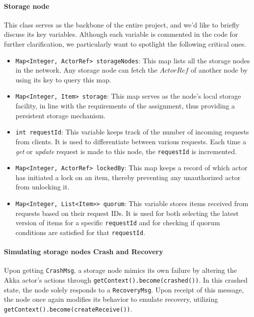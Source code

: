 \documentclass[a4paper, 11pt]{article}
\begin{document}
\paragraph{Storage node}\label{core_storage_class}

This class serves as the backbone of the entire project, and we'd like to briefly discuss its key variables. Although each variable is commented in the code for further clarification, we particularly want to spotlight the following critical ones.

\begin{itemize}
    \item \verb|Map<Integer, ActorRef> storageNodes|: This map lists all the storage nodes in the network. Any storage node can fetch the $ActorRef$ of another node by using its key to query this map.
    \item \verb|Map<Integer, Item> storage|: This map serves as the node's local storage facility, in line with the requirements of the assignment, thus providing a persistent storage mechanism.
    \item \verb|int requestId|: This variable keeps track of the number of incoming requests from clients. It is used to differentiate between various requests. Each time a \textit{get} or \textit{update} request is made to this node, the \verb|requestId| is incremented.
    \item \verb|Map<Integer, ActorRef> lockedBy|: This map keeps a record of which actor has initiated a lock on an item, thereby preventing any unauthorized actor from unlocking it.
    \item \verb|Map<Integer, List<Item>> quorum|: This variable stores items received from requests based on their request IDs. It is used for both selecting the latest version of items for a specific \verb|requestId| and for checking if quorum conditions are satisfied for that \verb|requestId|.
\end{itemize}

\paragraph{Simulating storage nodes Crash and Recovery} Upon getting \verb|CrashMsg|, a storage node mimics its own failure by altering the Akka actor's actions through \verb|getContext().become(crashed())|. In this crashed state, the node solely responds to a \verb|RecoveryMsg|. Upon receipt of this message, the node once again modifies its behavior to emulate recovery, utilizing \verb|getContext().become(createReceive())|.
\end{document}
